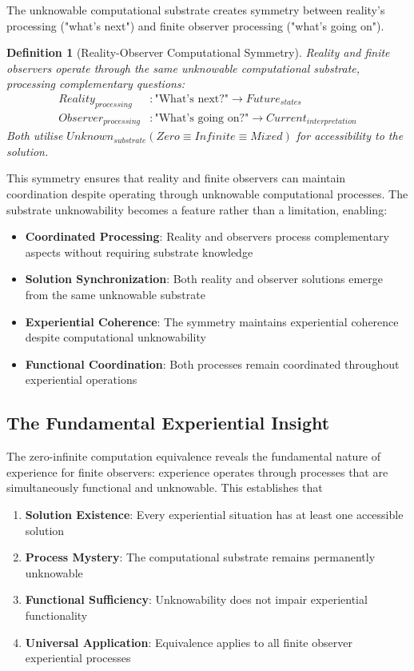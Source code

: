 \documentclass{article}
\newtheorem{definition}[theorem]{Definition}
\begin{document}
The unknowable computational substrate creates symmetry between reality's processing ("what's next") and finite observer processing ("what's going on").

\begin{definition}[Reality-Observer Computational Symmetry]
Reality and finite observers operate through the same unknowable computational substrate, processing complementary questions:
\begin{align}
Reality_{processing} &: \text{"What's next?"} \rightarrow Future_{states} \\
Observer_{processing} &: \text{"What's going on?"} \rightarrow Current_{interpretation}
\end{align}
Both utilise $Unknown_{substrate}(Zero \equiv Infinite \equiv Mixed)$ for accessibility to the solution.
\end{definition}

This symmetry ensures that reality and finite observers can maintain coordination despite operating through unknowable computational processes. The substrate unknowability becomes a feature rather than a limitation, enabling:

\begin{itemize}
\item \textbf{Coordinated Processing}: Reality and observers process complementary aspects without requiring substrate knowledge
\item \textbf{Solution Synchronization}: Both reality and observer solutions emerge from the same unknowable substrate
\item \textbf{Experiential Coherence}: The symmetry maintains experiential coherence despite computational unknowability
\item \textbf{Functional Coordination}: Both processes remain coordinated throughout experiential operations
\end{itemize}

\subsection{The Fundamental Experiential Insight}

The zero-infinite computation equivalence reveals the fundamental nature of experience for finite observers: experience operates through processes that are simultaneously functional and unknowable. This establishes that

\begin{enumerate}
\item \textbf{Solution Existence}: Every experiential situation has at least one accessible solution
\item \textbf{Process Mystery}: The computational substrate remains permanently unknowable
\item \textbf{Functional Sufficiency}: Unknowability does not impair experiential functionality
\item \textbf{Universal Application}: Equivalence applies to all finite observer experiential processes
\end{enumerate}
\end{document}
